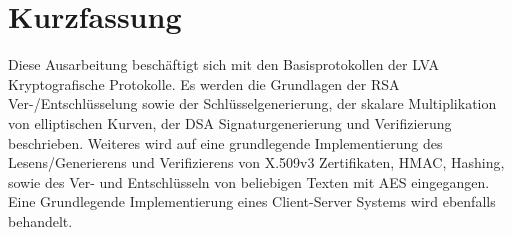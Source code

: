 
\thispagestyle{scrplain}

\section*{Kurzfassung}

Diese Ausarbeitung beschäftigt sich mit den Basisprotokollen der LVA Kryptografische Protokolle. Es werden die Grundlagen der RSA Ver-/Entschlüsselung sowie der Schlüsselgenerierung, der skalare Multiplikation von elliptischen Kurven, der DSA Signaturgenerierung und Verifizierung beschrieben.
Weiteres wird auf eine grundlegende Implementierung des Lesens/Generierens und Verifizierens von X.509v3 Zertifikaten, HMAC, Hashing, sowie des Ver- und Entschlüsseln von beliebigen Texten mit AES eingegangen.
Eine Grundlegende Implementierung eines Client-Server Systems wird ebenfalls behandelt.